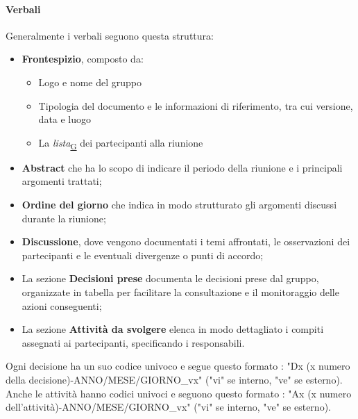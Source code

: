 \documentclass[a4paper,12pt]{article}
\begin{document}
        \paragraph{Verbali}\hfill\break
            Generalmente i verbali seguono questa struttura:
            \begin{itemize}
                \item \textbf{Frontespizio}, composto da:
                \begin{itemize}
                    \item Logo e nome del gruppo
                    \item Tipologia del documento e le informazioni di riferimento, tra cui versione, data e luogo
                    \item La \textit{lista}\textsubscript{\href{https://atlasteam9.github.io/Atlas/glossario.html\#Lista}{G}} dei partecipanti alla riunione
                \end{itemize}
                \item \textbf{Abstract} che ha lo scopo di indicare il periodo della riunione e i principali argomenti trattati;
                \item \textbf{Ordine del giorno} che indica in modo strutturato gli argomenti discussi durante la riunione;
                \item \textbf{Discussione}, dove vengono documentati i temi affrontati, le osservazioni dei partecipanti e le eventuali divergenze o punti di accordo;
                \item La sezione \textbf{Decisioni prese} documenta le decisioni prese dal gruppo, organizzate in tabella per facilitare la consultazione e il monitoraggio delle azioni conseguenti;
                \item La sezione \textbf{Attività da svolgere} elenca in modo dettagliato i compiti assegnati ai partecipanti, specificando i responsabili.
            \end{itemize}
            Ogni decisione ha un suo codice univoco e segue questo formato : "Dx (x numero della decisione)-ANNO/MESE/GIORNO\_vx" ("vi" se interno, "ve" se esterno).
            \\
            Anche le attività hanno codici univoci e seguono questo formato : "Ax (x numero dell'attività)-ANNO/MESE/GIORNO\_vx" ("vi" se interno, "ve" se esterno).
        
\end{document}
